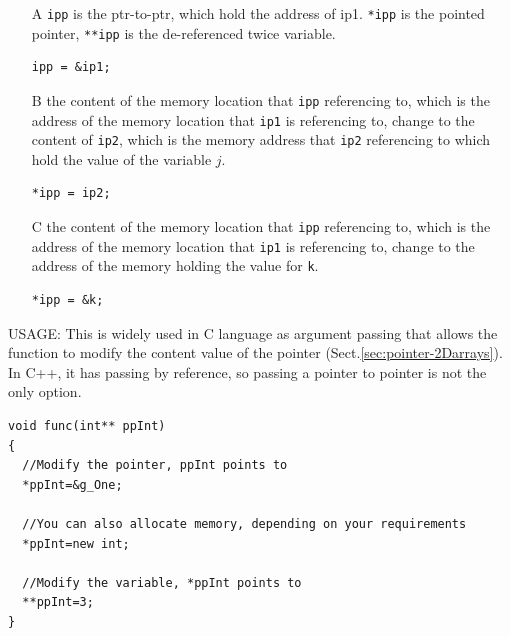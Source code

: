 \begin{itemize}
\item [A] \verb!ipp! is the ptr-to-ptr, which hold the address of ip1.
\verb!*ipp! is the pointed pointer, \verb!**ipp! is the de-referenced twice variable. 

\begin{lstlisting}
ipp = &ip1;
\end{lstlisting}
\item [B] the content of the memory location that \verb!ipp!
  referencing to, which is the address of the memory location that
  \verb!ip1! is referencing to, change to the content of \verb!ip2!,
  which is the memory address that \verb!ip2! referencing to which
  hold the value of the variable $j$.
\begin{lstlisting}
*ipp = ip2;
\end{lstlisting}
\item [C] the content of the memory location that \verb!ipp!
  referencing to, which is the address of the memory location that
  \verb!ip1! is referencing to, change to the address of the memory
  holding the value for \verb!k!.
\begin{lstlisting}
*ipp = &k;
\end{lstlisting}
\end{itemize}


USAGE: This is widely used in C language as argument passing that allows the
function to modify the content value of the pointer
(Sect.\ref{sec:pointer-2Darrays}). In C++, it has passing by reference, so
passing a pointer to pointer is not the only option.

\begin{verbatim}
void func(int** ppInt)
{
  //Modify the pointer, ppInt points to
  *ppInt=&g_One;

  //You can also allocate memory, depending on your requirements
  *ppInt=new int;

  //Modify the variable, *ppInt points to
  **ppInt=3;
}
\end{verbatim}

% 
% 


